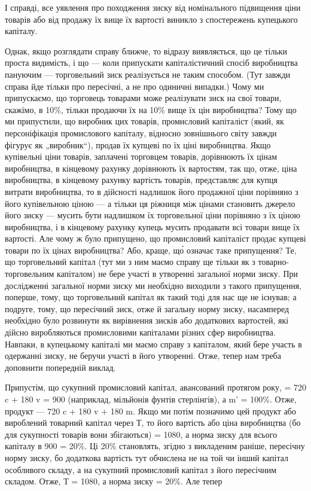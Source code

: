 І справді, все уявлення про походження зиску від номінального
підвищення ціни товарів або від продажу їх вище їх вартості
виникло з спостережень купецького капіталу.

Однак, якщо розглядати справу ближче, то відразу виявляється,
що це тільки проста видимість, і що — коли припускати
капіталістичний спосіб виробництва пануючим — торговельний
зиск реалізується не таким способом. (Тут завжди справа
йде тільки про пересічні, а не про одиничні випадки.) Чому
ми припускаємо, що торговець товарами може реалізувати зиск
на свої товари, скажімо, в 10\%, тільки продаючи їх на 10\%
вище їх цін виробництва? Тому що ми припустили, що виробник
цих товарів, промисловий капіталіст (який, як персоніфікація
промислового капіталу, відносно зовнішнього світу завжди
фігурує як „виробник“), продав їх купцеві по їх ціні виробництва.
Якщо купівельні ціни товарів, заплачені торговцем товарів, дорівнюють
їх цінам виробництва, в кінцевому рахунку дорівнюють
їх вартостям, так що, отже, ціна виробництва, в кінцевому рахунку
вартість товарів, представляє для купця витрати виробництва, то
в дійсності надлишок його продажної ціни порівняно з його купівельною
ціною — а тільки ця ріжниця між цінами становить джерело
його зиску — мусить бути надлишком їх торговельної ціни
порівняно з їх ціною виробництва, і в кінцевому рахунку купець
мусить продавати всі товари вище їх вартості. Але чому ж було
припущено, що промисловий капіталіст продає купцеві товари по
їх цінах виробництва? Або, краще, що́ означає таке припущення?
Те, що торговельний капітал (тут ми з ним маємо справу
ще тільки як з товарно-торговельним капіталом) не бере участі
в утворенні загальної норми зиску. При дослідженні загальної
норми зиску ми необхідно виходили з такого припущення, поперше,
тому, що торговельний капітал як такий тоді для нас
ще не існував; а подруге, тому, що пересічний зиск, отже й загальну
норму зиску, насамперед необхідно було розвинути як
вирівнення зисків або додаткових вартостей, які дійсно виробляються
промисловими капіталами різних сфер виробництва.
Навпаки, в купецькому капіталі ми маємо справу з капіталом,
який бере участь в одержанні зиску, не беручи участі в його
утворенні. Отже, тепер нам треба доповнити попередній виклад.

Припустім, що сукупний промисловий капітал, авансований
протягом року, = 720 c + 180 v = 900 (наприклад, мільйонів фунтів
стерлінгів), а m' = 100\%. Отже, продукт — 720 c + 180 v + 180 m.
Якщо ми потім позначимо цей продукт або вироблений товарний
капітал через Т, то його вартість або ціна виробництва
(бо для сукупності товарів вони збігаються) = 1080, а норма
зиску для всього капіталу в 900 = 20\%. Ці 20\% становлять,
згідно з викладеним раніше, пересічну норму зиску, бо додаткова
вартість тут обчислена не на той чи інший капітал особливого
складу, а на сукупний промисловий капітал з його пересічним
складом. Отже, Т = 1080, а норма зиску = 20\%. Але тепер
